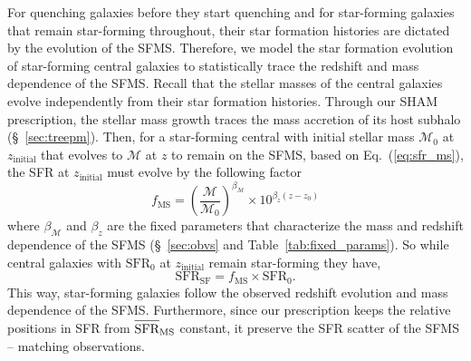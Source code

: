 \documentclass[iop,apj,tighten,twocolappendix,numberedappendix]{emulateapj}
\newcommand{\beq}{\begin{equation}}
\newcommand{\eeq}{\end{equation}}
\newcommand{\avgSFR}{\overline{\raisebox{0pt}[1.2\height]{SFR}}}
\newcommand{\SFR}{\mathrm{SFR}}
\newcommand{\zinit}{z_\mathrm{initial}}
\begin{document}
For quenching galaxies before they start quenching and for 
star-forming galaxies that remain star-forming throughout, 
their star formation histories are dictated by the evolution 
of the SFMS. Therefore, we model the star formation evolution of star-forming 
central galaxies to statistically trace the redshift and mass 
dependence of the SFMS. Recall that the stellar masses of the central galaxies
evolve independently from their star formation histories.
Through our SHAM prescription, the stellar mass growth traces 
the mass accretion of its host subhalo (\S~\ref{sec:treepm}).
Then, for a star-forming central with initial stellar mass 
$\mathcal{M}_0$ at $\zinit$ that evolves to $\mathcal{M}$ 
at $z$ to remain on the SFMS, based on Eq.~(\ref{eq:sfr_ms}), 
the SFR at $\zinit$ must evolve by the following factor  
\beq \label{eq:delta_sfr_ms}
f_\mathrm{MS} = \left(\frac{\mathcal{M}}{\mathcal{M}_0}\right)^{\beta_\mathcal{M}} \times
10^{\beta_z (z - z_0)}
\eeq
where $\beta_\mathcal{M}$ and $\beta_z$ are the fixed parameters 
that characterize the mass and redshift dependence of the SFMS 
(\S~\ref{sec:obvs} and Table~\ref{tab:fixed_params}). So
while central galaxies with $\SFR_0$ at $\zinit$ remain 
star-forming they have, 
\beq
\SFR_\mathrm{SF} = f_\mathrm{MS} \times \SFR_0.
\eeq
This way, star-forming galaxies follow the observed redshift 
evolution and mass dependence of the SFMS. Furthermore, since 
our prescription keeps the relative positions in SFR from 
$\avgSFR_\mathrm{MS}$ constant, it preserve the SFR scatter 
of the SFMS -- matching observations. 
\end{document}
